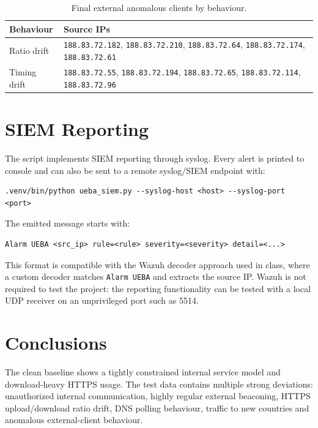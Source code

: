 \documentclass[11pt,a4paper]{article}
\newcommand{\ip}[1]{\texttt{#1}}
\begin{document}
\begin{table}[H]
\centering
\caption{Final external anomalous clients by behaviour.}
\begin{tabularx}{\textwidth}{lY}
\toprule
Behaviour & Source IPs \\
\midrule
Ratio drift & \ip{188.83.72.182}, \ip{188.83.72.210}, \ip{188.83.72.64},
\ip{188.83.72.174}, \ip{188.83.72.61} \\
Timing drift & \ip{188.83.72.55}, \ip{188.83.72.194}, \ip{188.83.72.65},
\ip{188.83.72.114}, \ip{188.83.72.96} \\
\bottomrule
\end{tabularx}
\end{table}

\section{SIEM Reporting}

The script implements SIEM reporting through syslog. Every alert is printed to
console and can also be sent to a remote syslog/SIEM endpoint with:

\begin{verbatim}
.venv/bin/python ueba_siem.py --syslog-host <host> --syslog-port <port>
\end{verbatim}

The emitted message starts with:

\begin{verbatim}
Alarm UEBA <src_ip> rule=<rule> severity=<severity> detail=<...>
\end{verbatim}

This format is compatible with the Wazuh decoder approach used in class, where
a custom decoder matches \texttt{Alarm UEBA} and extracts the source IP. Wazuh
is not required to test the project: the reporting functionality can be tested
with a local UDP receiver on an unprivileged port such as 5514.

\section{Conclusions}

The clean baseline shows a tightly constrained internal service model and
download-heavy HTTPS usage. The test data contains multiple strong deviations:
unauthorized internal communication, highly regular external beaconing, HTTPS
upload/download ratio drift, DNS polling behaviour, traffic to new countries
and anomalous external-client behaviour.
\end{document}
